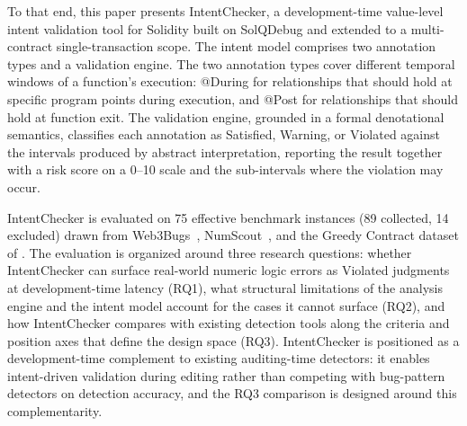 \documentclass[pdflatex,sn-basic]{sn-jnl}%
\theoremstyle{thmstyleone}%
\theoremstyle{thmstyletwo}%
\theoremstyle{thmstylethree}%
\begin{document}
To that end, this paper presents IntentChecker, a development-time value-level intent validation tool for Solidity built on SolQDebug and extended to a multi-contract single-transaction scope.
The intent model comprises two annotation types and a validation engine. The two annotation types cover different temporal windows of a function's execution: @During for relationships that should hold at specific program points during execution, and @Post for relationships that should hold at function exit. The validation engine, grounded in a formal denotational semantics, classifies each annotation as Satisfied, Warning, or Violated against the intervals produced by abstract interpretation, reporting the result together with a risk score on a 0--10 scale and the sub-intervals where the violation may occur.

IntentChecker is evaluated on 75 effective benchmark instances (89 collected, 14 excluded) drawn from Web3Bugs~\citep{exploitablebugs}, NumScout~\citep{numscout}, and the Greedy Contract dataset of \citet{flyinointment}.
The evaluation is organized around three research questions: whether IntentChecker can surface real-world numeric logic errors as Violated judgments at development-time latency (RQ1), what structural limitations of the analysis engine and the intent model account for the cases it cannot surface (RQ2), and how IntentChecker compares with existing detection tools along the criteria and position axes that define the design space (RQ3).
IntentChecker is positioned as a development-time complement to existing auditing-time detectors: it enables intent-driven validation during editing rather than competing with bug-pattern detectors on detection accuracy, and the RQ3 comparison is designed around this complementarity.
\end{document}
